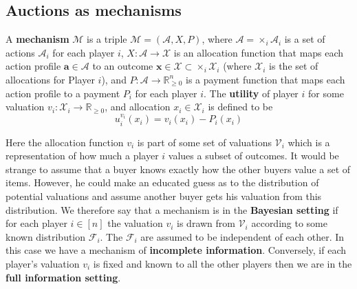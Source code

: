 \subsection{Auctions as mechanisms} %
\label{sub:Auctions as mechanisms}
\begin{definition}
  A \textbf{mechanism} $ \mathcal{M} $ is a triple $ \mathcal{M} = (\mathcal{A}, X, P) $, where $ \mathcal{A} = \times_i \mathcal{A}_i $ is a set of actions $ \mathcal{A}_i $ for each player $ i $, $ X: \mathcal{A} \to \mathcal{X} $ is an allocation function that maps each action profile $ \mathbf{a} \in \mathcal{A} $ to an outcome $ \mathbf{x} \in \mathcal{X} \subset \times_i \mathcal{X}_i $ (where $ \mathcal{X}_i $ is the set of allocations for Player $ i $), and $ P: \mathcal{A} \to \mathbb{R}_{\geq 0}^{n} $ is a payment function that maps each action profile to a payment $ P_i $ for each player $ i $. The \textbf{utility} of player $ i $ for some valuation $ v_i:\mathcal{X}_i \to \mathbb{R}_{\geq 0} $, and allocation $ x_i \in \mathcal{X}_i $ is defined to be
\begin{equation}
  u_i^{v_i}(x_i) = v_i(x_i) - P_i(x_i)
  \label{eq:utility}
\end{equation}
\end{definition}
Here the allocation function $ v_i $ is part of some set of valuations $ \mathcal{V}_i $ which is a representation of how much a player $ i $ values a subset of outcomes.
It would be strange to assume that a buyer knows exactly how the other buyers value a set of items. However, he could make an educated guess as to the distribution of potential valuations and assume another buyer gets his valuation from this distribution. We therefore say that a mechanism is in the \textbf{Bayesian setting} if for each player $ i \in [n] $ the valuation $ v_i $ is drawn from $ \mathcal{V}_i $ according to some known distribution $ \mathcal{F}_i $. The $ \mathcal{F}_i $ are assumed to be independent of each other. In this case we have a mechanism of \textbf{incomplete information}. Conversely, if each player's valuation $ v_i $ is fixed and known to all the other players then we are in the \textbf{full information setting}.


